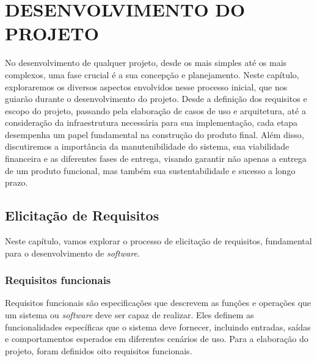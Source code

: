 \chapter{DESENVOLVIMENTO DO PROJETO}
\label{geral-requisitos-gerenciamento}

No desenvolvimento de qualquer projeto, desde os mais simples até os mais complexos, uma fase crucial é a sua concepção e planejamento. Neste capítulo, exploraremos os diversos aspectos envolvidos nesse processo inicial, que nos guiarão durante o desenvolvimento do projeto. Desde a definição dos requisitos e escopo do projeto, passando pela elaboração de casos de uso e arquitetura, até a consideração da infraestrutura necessária para sua implementação, cada etapa desempenha um papel fundamental na construção do produto final. Além disso, discutiremos a importância da manutenibilidade do sistema, sua viabilidade financeira e as diferentes fases de entrega, visando garantir não apenas a entrega de um produto funcional, mas também sua sustentabilidade e sucesso a longo prazo.

\section{Elicitação de Requisitos}
Neste capítulo, vamos explorar o processo de elicitação de requisitos, fundamental para o desenvolvimento de \textit{software}.

\subsection{Requisitos funcionais}

Requisitos funcionais são especificações que descrevem as funções e operações que um sistema ou \textit{software} deve ser capaz de realizar. Eles definem as funcionalidades específicas que o sistema deve fornecer, incluindo entradas, saídas e comportamentos esperados em diferentes cenários de uso. Para a elaboração do projeto, foram definidos oito requisitos funcionais.

